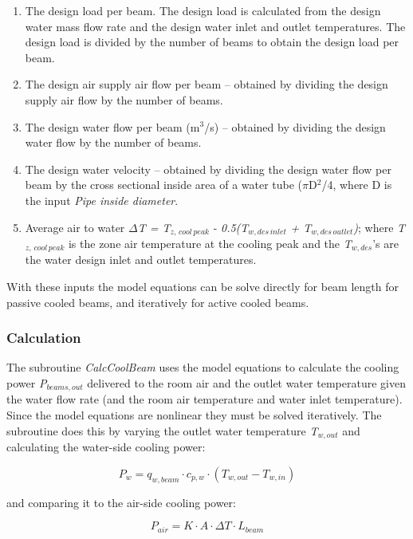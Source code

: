 \begin{enumerate}
\item The design load per beam. The design load is calculated from the design water mass flow rate and the design water inlet and outlet temperatures. The design load is divided by the number of beams to obtain the design load per beam.
\item The design air supply air flow per beam -- obtained by dividing the design supply air flow by the number of beams.
\item The design water flow per beam (m\(^{3}\)/s) -- obtained by dividing the design water flow by the number of beams.
\item The design water velocity -- obtained by dividing the design water flow per beam by the cross sectional inside area of a water tube (\(\pi\)D\(^{2}\)/4, where D is the input \emph{Pipe inside diameter}.
\item Average air to water \emph{\(\Delta\)T = T\(_{z,\, cool\, peak}\)} - \emph{0.5(T\(_{w,des\, inlet}\)} \emph{+ T\(_{w,des\, outlet}\))}; where \emph{T\(_{z,\, cool\, peak}\)} is the zone air temperature at the cooling peak and the \emph{T\(_{w,des}\)}'s are the water design inlet and outlet temperatures.
\end{enumerate}

With these inputs the model equations can be solve directly for beam length for passive cooled beams, and iteratively for active cooled beams.

\subsubsection{Calculation}\label{calculation-3}

The subroutine \emph{CalcCoolBeam} uses the model equations to calculate the cooling power \emph{P\(_{beams,out}\)} delivered to the room air and the outlet water temperature given the water flow rate (and the room air temperature and water inlet temperature). Since the model equations are nonlinear they must be solved iteratively. The subroutine does this by varying the outlet water temperature \emph{T\(_{w,out}\)} and calculating the water-side cooling power:

\begin{equation}
P_{w} = q_{w,beam}·c_{p,w}·(T_{w,out}-T_{w,in})
\end{equation}

and comparing it to the air-side cooling power:

\begin{equation}
P_{air} = K·A·\Delta T·L_{beam}
\end{equation}

